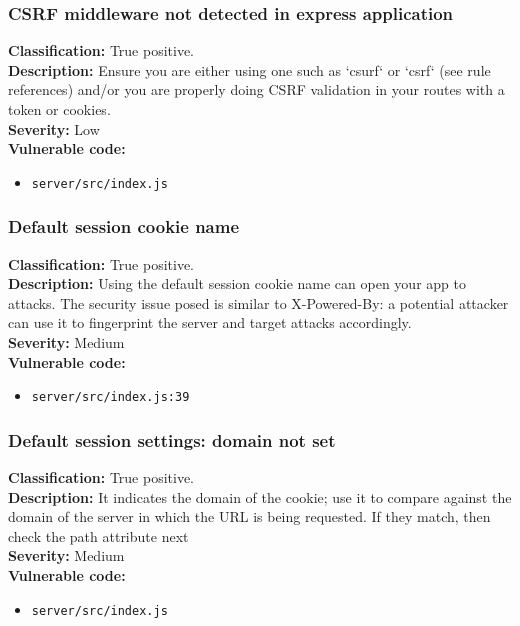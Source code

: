 \documentclass[]{article}
\begin{document}
\subsubsection{CSRF middleware not detected in express application}
\textbf{Classification:} {True positive.} \\
\textbf{Description:}  Ensure you are either using one such
          as `csurf` or `csrf` (see rule references) and/or you are properly doing CSRF validation in your    
          routes with a token or cookies.\\ 
\textbf{Severity:}  Low \\ 
\textbf{Vulnerable code:}
\begin{itemize}
    \item \texttt{server/src/index.js}
\end{itemize}


\subsubsection{Default session cookie name}
\textbf{Classification:} {True positive.} \\
\textbf{Description:} Using the default session cookie name can open your app to
          attacks. The security issue posed is similar to X-Powered-By: a potential attacker can use it to    
          fingerprint the server and target attacks accordingly. \\ 
\textbf{Severity:}  Medium \\ 
\textbf{Vulnerable code:}
\begin{itemize}
    \item \texttt{server/src/index.js:39}
\end{itemize}


\subsubsection{Default session settings: domain not set}
\textbf{Classification:} {True positive.} \\
\textbf{Description:} It indicates the domain of the cookie; use it
          to compare against the domain of the server in which the URL is being requested. If they match, then
          check the path attribute next \\ 
\textbf{Severity:}  Medium \\ 
\textbf{Vulnerable code:}
\begin{itemize}
    \item \texttt{server/src/index.js}
\end{itemize}
\end{document}
